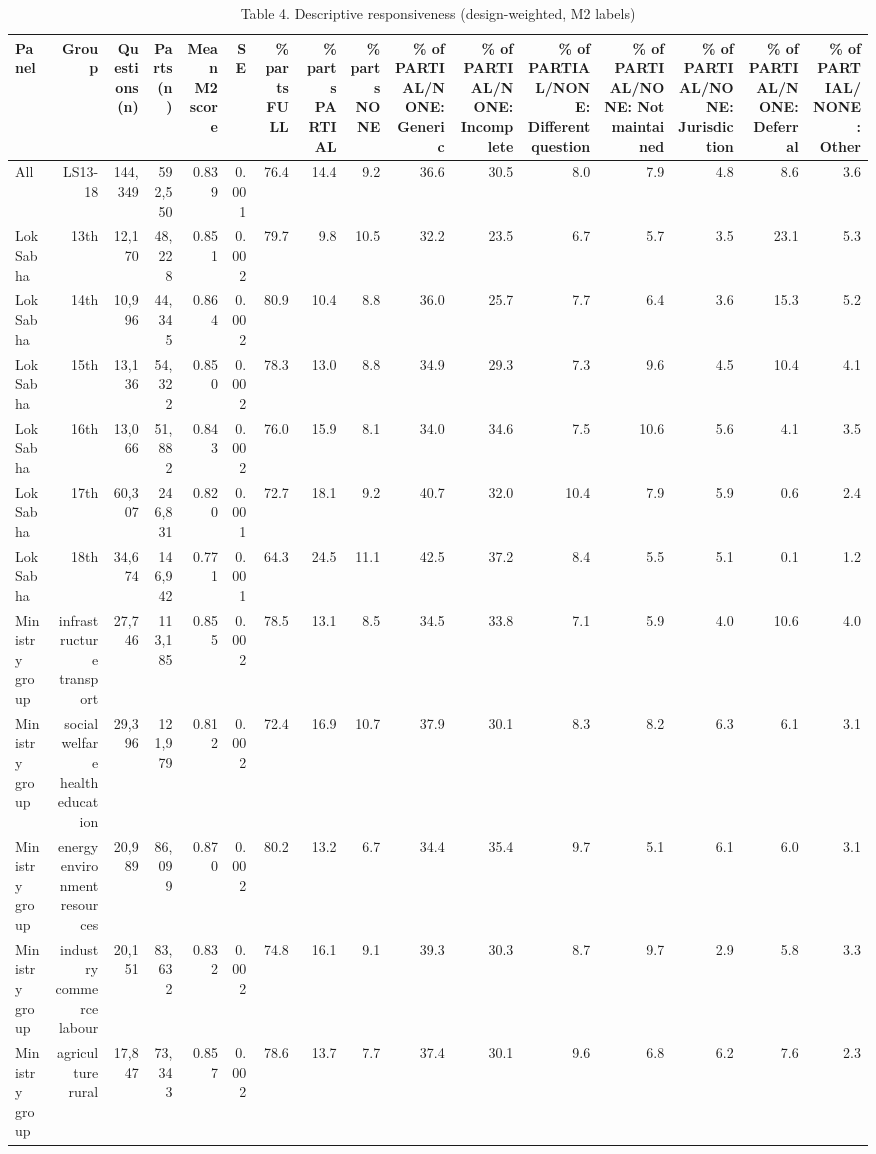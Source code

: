 \begin{table}[ht]
\centering
\small
\caption{Table 4. Descriptive responsiveness (design-weighted, M2 labels)}
\begin{tabular}{lrrrrrrrrrrrrrrr}
\toprule
Panel & Group & Questions (n) & Parts (n) & Mean M2 score & SE & \% parts FULL & \% parts PARTIAL & \% parts NONE & \% of PARTIAL/NONE: Generic & \% of PARTIAL/NONE: Incomplete & \% of PARTIAL/NONE: Different question & \% of PARTIAL/NONE: Not maintained & \% of PARTIAL/NONE: Jurisdiction & \% of PARTIAL/NONE: Deferral & \% of PARTIAL/NONE: Other \\
\midrule
All & LS13-18 & 144,349 & 592,550 & 0.839 & 0.001 & 76.4 & 14.4 & 9.2 & 36.6 & 30.5 & 8.0 & 7.9 & 4.8 & 8.6 & 3.6 \\
Lok Sabha & 13th & 12,170 & 48,228 & 0.851 & 0.002 & 79.7 & 9.8 & 10.5 & 32.2 & 23.5 & 6.7 & 5.7 & 3.5 & 23.1 & 5.3 \\
Lok Sabha & 14th & 10,996 & 44,345 & 0.864 & 0.002 & 80.9 & 10.4 & 8.8 & 36.0 & 25.7 & 7.7 & 6.4 & 3.6 & 15.3 & 5.2 \\
Lok Sabha & 15th & 13,136 & 54,322 & 0.850 & 0.002 & 78.3 & 13.0 & 8.8 & 34.9 & 29.3 & 7.3 & 9.6 & 4.5 & 10.4 & 4.1 \\
Lok Sabha & 16th & 13,066 & 51,882 & 0.843 & 0.002 & 76.0 & 15.9 & 8.1 & 34.0 & 34.6 & 7.5 & 10.6 & 5.6 & 4.1 & 3.5 \\
Lok Sabha & 17th & 60,307 & 246,831 & 0.820 & 0.001 & 72.7 & 18.1 & 9.2 & 40.7 & 32.0 & 10.4 & 7.9 & 5.9 & 0.6 & 2.4 \\
Lok Sabha & 18th & 34,674 & 146,942 & 0.771 & 0.001 & 64.3 & 24.5 & 11.1 & 42.5 & 37.2 & 8.4 & 5.5 & 5.1 & 0.1 & 1.2 \\
Ministry group & infrastructure transport & 27,746 & 113,185 & 0.855 & 0.002 & 78.5 & 13.1 & 8.5 & 34.5 & 33.8 & 7.1 & 5.9 & 4.0 & 10.6 & 4.0 \\
Ministry group & social welfare health education & 29,396 & 121,979 & 0.812 & 0.002 & 72.4 & 16.9 & 10.7 & 37.9 & 30.1 & 8.3 & 8.2 & 6.3 & 6.1 & 3.1 \\
Ministry group & energy environment resources & 20,989 & 86,099 & 0.870 & 0.002 & 80.2 & 13.2 & 6.7 & 34.4 & 35.4 & 9.7 & 5.1 & 6.1 & 6.0 & 3.1 \\
Ministry group & industry commerce labour & 20,151 & 83,632 & 0.832 & 0.002 & 74.8 & 16.1 & 9.1 & 39.3 & 30.3 & 8.7 & 9.7 & 2.9 & 5.8 & 3.3 \\
Ministry group & agriculture rural & 17,847 & 73,343 & 0.857 & 0.002 & 78.6 & 13.7 & 7.7 & 37.4 & 30.1 & 9.6 & 6.8 & 6.2 & 7.6 & 2.3 \\

\end{tabular}
\end{table}
